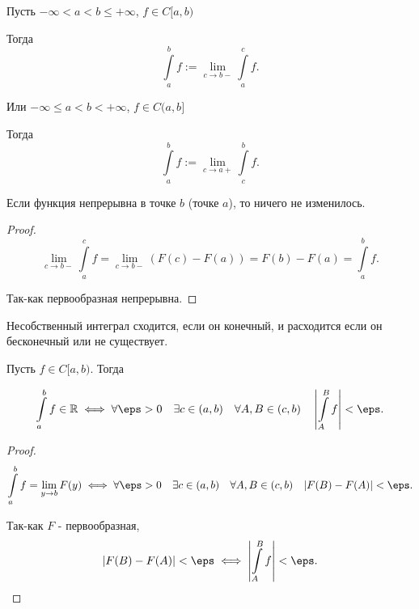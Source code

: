 
\begin{definition} \thmslashn 

    Пусть $-\infty < a < b \le +\infty$, $f\in C[a, b)$

    Тогда
    \[ \int\limits_{a}^{b} f := \lim\limits_{c \to b-} \int\limits_{a}^{c} f   .\]
    
    Или $-\infty \le a < b < +\infty$, $f\in C(a, b]$

    Тогда
    \[ \int\limits_{a}^{b} f := \lim\limits_{c \to a+} \int\limits_{c}^{b} f   .\] 
\end{definition}
\begin{remark} \thmslashn

    Если функция непрерывна в точке $b$ (точке $a$), то ничего не изменилось.
    \begin{proof}
        \[ \lim\limits_{c \to b-} \int\limits_{a}^{c} f = \lim\limits_{c \to b-} (F(c) - F(a)) = F(b) - F(a) = \int\limits_{a}^{b} f  .\]
        
        Так-как первообразная непрерывна.
    \end{proof}
\end{remark}
\begin{definition} \thmslashn 

    Несобственный интеграл сходится, если он конечный, и расходится если он бесконечный или не существует.
\end{definition}
\begin{theorem} \thmslashn

    Пусть $f\in C[a, b)$. Тогда

    \[ \int\limits_{a}^{b} f\in \mathbb{R} \iff \forall{\eps > 0}\quad \exists{c\in (a, b)}\quad \forall{A, B\in (c, b)}\quad \left| \int\limits_{A}^{B} f\right| < \eps   .\]
    \begin{proof}
        \[ \int\limits_{a}^{b} f = \lim\limits_{y \to b} F(y) \iff \forall{\eps > 0}\quad \exists{c\in \left( a, b \right) }\quad \forall{A, B\in (c, b)}\quad |F(B) - F(A)| < \eps  .\]

        Так-как $F$ - первообразная, 
        \[ |F(B) - F(A)| <\eps \iff  \left| \int\limits_{A}^{B} f\right| < \eps  \qedhere.\]

        
    \end{proof}
\end{theorem}
